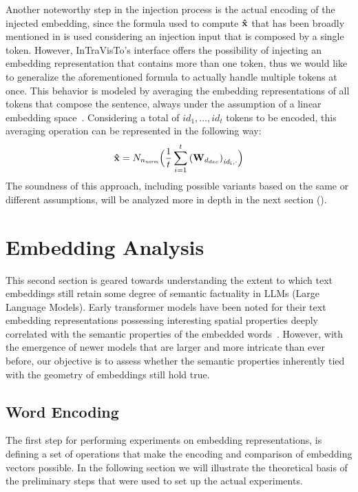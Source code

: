 Another noteworthy step in the injection process is the actual encoding of the injected embedding, since the formula used to compute $\bm{\mathbf{\hat x}}$ that has been broadly mentioned in  is used considering an injection input that is composed by a single token.
However, InTraVisTo's interface offers the possibility of injecting an embedding representation that contains more than one token, thus we would like to generalize the aforementioned formula to actually handle multiple tokens at once.
 This behavior is modeled by averaging the embedding representations of all tokens that compose the sentence, always under the assumption of a linear embedding space~\cite{mikolov2013,park2023}. 
Considering a total of $id_1,\ldots,id_t$ tokens to be encoded, this averaging operation can be represented in the following way:
\begin{equation}
    \label{eq:method_intravisto_emb-avg}
    \bm{\mathbf{\hat x}} = N_{n_\textit{norm}}\Bigl(\frac{1}{t} \sum_{i=1}^{t}{{(\bm{\mathbf{W}}_{d_{dec}})}_{\textit{id}_{i},\cdot}}\Bigr)
\end{equation}
The soundness of this approach, including possible variants based on the same or different assumptions, will be analyzed more in depth in the next section ().


\section{Embedding Analysis}\label{sec:method_embeddings}

This second section is geared towards understanding the extent to which text embeddings still retain some degree of semantic factuality in LLMs (Large Language Models).
Early transformer models have been noted for their text embedding representations possessing interesting spatial properties deeply correlated with the semantic properties of the embedded words~\cite{allen2019,kalinowski2020}.
However, with the emergence of newer models that are larger and more intricate than ever before, our objective is to assess whether the semantic properties inherently tied with the geometry of embeddings still hold true.

\subsection{Word Encoding}

The first step for performing experiments on embedding representations, is defining a set of operations that make the encoding and comparison of embedding vectors possible.
In the following section we will illustrate the theoretical basis of the preliminary steps that were used to set up the actual experiments.

